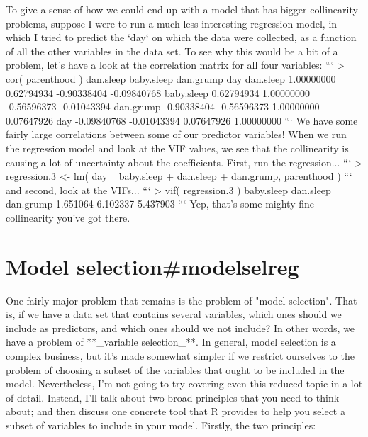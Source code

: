 To give a sense of how we could end up with a model that has bigger collinearity problems, suppose I were to run a much less interesting regression model, in which I tried to predict the `day` on which the data were collected, as a function of all the other variables in the data set. To see why this would be a bit of a problem, let's have a look at the correlation matrix for all four variables:
```
> cor( parenthood )
             dan.sleep  baby.sleep   dan.grump         day
dan.sleep   1.00000000  0.62794934 -0.90338404 -0.09840768
baby.sleep  0.62794934  1.00000000 -0.56596373 -0.01043394
dan.grump  -0.90338404 -0.56596373  1.00000000  0.07647926
day        -0.09840768 -0.01043394  0.07647926  1.00000000
```
We have some fairly large correlations between some of our predictor variables! When we run the regression model and look at the VIF values, we see that the collinearity is causing a lot of uncertainty about the coefficients. First, run the regression...
```
> regression.3 <- lm( day ~ baby.sleep + dan.sleep + dan.grump, parenthood )
```
and second, look at the VIFs...
```
> vif( regression.3 )
baby.sleep  dan.sleep  dan.grump 
  1.651064   6.102337   5.437903 
```
Yep, that's some mighty fine collinearity you've got there.




\section{Model selection{#modelselreg}}

One fairly major problem that remains is the problem of "model selection". That is, if we have a data set that contains several variables, which ones should we include as predictors, and which ones should we not include? In other words, we have a problem of **_variable selection_**. In general, model selection is a complex business, but it's made somewhat simpler if we restrict ourselves to the problem of choosing a subset of the variables that ought to be included in the model. Nevertheless, I'm not going to try covering even this reduced topic in a lot of detail. Instead, I'll talk about two broad principles that you need to think about; and then discuss one concrete tool that R provides to help you select a subset of variables to include in your model. Firstly, the two principles:

